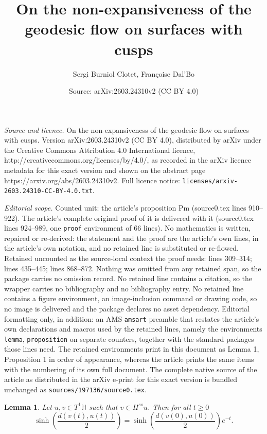 \documentclass[10pt,a4paper]{amsart}
\title{On the non-expansiveness of the geodesic flow on surfaces with cusps}
\author{Sergi Burniol Clotet, Fran\c{c}oise Dal'Bo}
\date{Source: arXiv:2603.24310v2 (CC BY 4.0)}
\newtheorem{lemma}{Lemma}
\renewcommand{\H}{\mathbb{H}}
\begin{document}
\maketitle

\noindent\emph{Source and licence.} On the non-expansiveness of the geodesic flow on surfaces with cusps. Version arXiv:2603.24310v2 (CC BY 4.0), distributed by arXiv under the Creative Commons Attribution 4.0 International licence, http://creativecommons.org/licenses/by/4.0/, as recorded in the arXiv licence metadata for this exact version and shown on the abstract page https://arxiv.org/abs/2603.24310v2. Full licence notice: \texttt{licenses/arxiv-2603.24310-CC-BY-4.0.txt}.\par\smallskip

\noindent\textit{Editorial scope.} Counted unit: the article's proposition Pm (source0.tex lines 910--922). The article's complete original proof of it is delivered with it (source0.tex lines 924--989, one \texttt{proof} environment of 66 lines). No mathematics is written, repaired or re-derived: the statement and the proof are the article's own lines, in the article's own notation, and no retained line is substituted or re-flowed.  Retained uncounted as the source-local context the proof needs: lines 309--314; lines 435--445; lines 868--872.  Nothing was omitted from any retained span, so the package carries no omission record.  No retained line contains a citation, so the wrapper carries no bibliography and no bibliography entry.  No retained line contains a figure environment, an image-inclusion command or drawing code, so no image is delivered and the package declares no asset dependency.  Editorial formatting only, in addition: an AMS \texttt{amsart} preamble that restates the article's own declarations and macros used by the retained lines, namely the environments \texttt{lemma}, \texttt{proposition} on separate counters, together with the standard packages those lines need.  The retained environments print in this document as Lemma 1, Proposition 1 in order of appearance, whereas the article prints the same items with the numbering of its own full document.  The complete native source of the article as distributed in the arXiv e-print for this exact version is bundled unchanged as \texttt{sources/197136/source0.tex}.
	\begin{lemma}\label{distance_horo}
		Let $u,v\in T^1\H$ such that $v\in H^{ss} u$. Then for all $t\ge0$
		\[
		\sinh\left(\frac{d(v(t),u(t))}{2}\right) = \sinh\left(\frac{d(v(0),u(0))}{2}\right)e^{-t}.
		\]
	\end{lemma}
\end{document}
